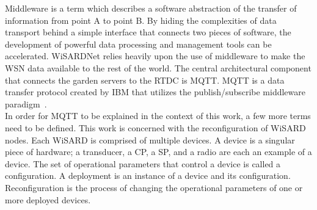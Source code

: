 
Middleware is a term which describes a software abstraction of the transfer of information from point A to  point B. By hiding the complexities of data transport behind a simple interface that connects two pieces of software, the development of powerful data processing and management tools can be accelerated. WiSARDNet relies heavily upon the use of middleware to make the WSN data available to the rest of the world. The central architectural component that connects the garden servers to the RTDC is MQTT. MQTT is a data transfer protocol created by IBM that utilizes the publish/subscribe middleware paradigm~\cite{HunTruSta08}.\\

In order for MQTT to be explained in the context of this work, a few more terms need to be defined. This work is concerned with the reconfiguration of WiSARD nodes. Each WiSARD is comprised of multiple devices. A device is a singular piece of hardware; a transducer, a CP, a SP, and a radio are each an example  of a device. The set of operational parameters that control a device is called a configuration. A deployment is an instance of a device and its configuration. Reconfiguration is the process of changing the operational parameters of one or more deployed devices.\\

